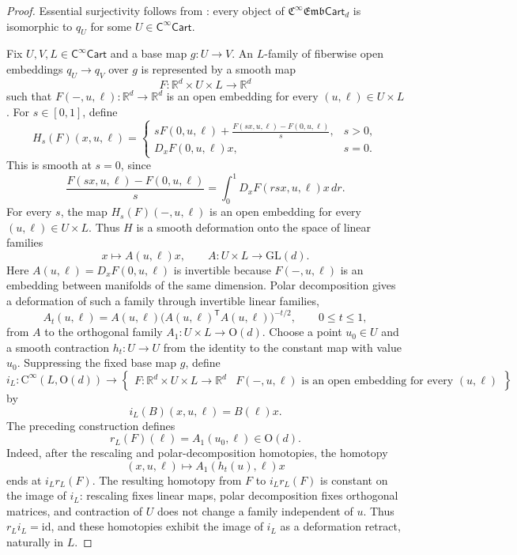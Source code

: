 \documentclass{amsart}
\newcommand{\cat}[1]{\mathsf{#1}}
\newcommand{\id}{\mathrm{id}}
\newcommand{\Cart}{\cat{C}^{\infty}\cat{Cart}}
\newcommand{\fembcart}[1]{\mathfrak{C}^{\infty}\mathfrak{Emb}\cat{Cart}_{#1}}
\newcommand{\GL}{\mathrm{GL}}
\newcommand{\RR}{{\mathbb{R}}}
\theoremstyle{definition}
\numberwithin{equation}{subsection}
\numberwithin{subsubsection}{subsection}
\begin{document}
\begin{proof}
  Essential surjectivity follows from : every object
  of \(\fembcart{d}\) is isomorphic to \(q_U\) for some \(U\in\Cart\).

  Fix \(U,V,L\in\Cart\) and a base map \(g:U\to V\). An \(L\)-family
  of fiberwise open embeddings \(q_U\to q_V\) over \(g\) is represented by
  a smooth map
  \[
    F:\RR^d\times U\times L\longrightarrow\RR^d
  \]
  such that \(F(-,u,\ell):\RR^d\to\RR^d\) is an open embedding for
  every \((u,\ell)\in U\times L\). For \(s\in[0,1]\), define
  \[
    H_s(F)(x,u,\ell)=
    \begin{cases}
      \displaystyle
      sF(0,u,\ell)+\frac{F(sx,u,\ell)-F(0,u,\ell)}{s},&s>0,\\[1.2ex]
      D_xF(0,u,\ell)x,&s=0.
    \end{cases}
  \]
  This is smooth at \(s=0\), since
  \[
    \frac{F(sx,u,\ell)-F(0,u,\ell)}{s}
    =
    \int_0^1D_xF(rsx,u,\ell)x\,dr.
  \]
  For every \(s\), the map \(H_s(F)(-,u,\ell)\) is an open embedding
  for every \((u,\ell)\in U\times L\). Thus \(H\) is a smooth
  deformation onto the space of linear families
  \[
    x\longmapsto A(u,\ell)x,
    \qquad A:U\times L\longrightarrow\GL(d).
  \]
  Here \(A(u,\ell)=D_xF(0,u,\ell)\) is invertible because
  \(F(-,u,\ell)\) is an embedding between manifolds of the same dimension.
  Polar decomposition gives a deformation of such a family through
  invertible linear families,
  \[
    A_t(u,\ell)
    =A(u,\ell)\bigl(A(u,\ell)^{\mathsf{T}}A(u,\ell)\bigr)^{-t/2},
    \qquad 0\leq t\leq1,
  \]
  from \(A\) to the orthogonal family \(A_1:U\times L\to\mathrm{O}(d)\).
  Choose a point \(u_0\in U\) and a smooth contraction \(h_t:U\to U\) from
  the identity to the constant map with value \(u_0\). Suppressing the fixed
  base map \(g\), define
  \[
    i_L:\mathrm{C}^\infty(L,\mathrm{O}(d))
    \longrightarrow
    \left\{
      \begin{array}{c|c}
        F:\RR^d\times U\times L\to\RR^d
        &F(-,u,\ell)\text{ is an open embedding for every }(u,\ell)
      \end{array}
    \right\}
  \]
  by
  \[
    i_L(B)(x,u,\ell)=B(\ell)x.
  \]
  The preceding construction defines
  \[
    r_L(F)(\ell)=A_1(u_0,\ell)\in\mathrm{O}(d).
  \]
  Indeed, after the rescaling and polar-decomposition homotopies, the
  homotopy
  \[
    (x,u,\ell)\longmapsto A_1(h_t(u),\ell)x
  \]
  ends at \(i_Lr_L(F)\). The resulting homotopy from \(F\) to
  \(i_Lr_L(F)\) is constant on the image of \(i_L\): rescaling fixes linear
  maps, polar decomposition fixes orthogonal matrices, and contraction of
  \(U\) does not change a family independent of \(u\). Thus
  \(r_Li_L=\id\), and these homotopies exhibit the image of \(i_L\) as a
  deformation retract, naturally in \(L\).


\end{proof}
\end{document}
